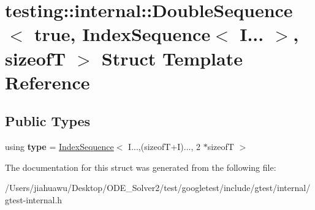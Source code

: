 \hypertarget{structtesting_1_1internal_1_1_double_sequence_3_01true_00_01_index_sequence_3_01_i_8_8_8_01_4_00_01sizeof_t_01_4}{}\section{testing\+:\+:internal\+:\+:Double\+Sequence$<$ true, Index\+Sequence$<$ I... $>$, sizeofT $>$ Struct Template Reference}
\label{structtesting_1_1internal_1_1_double_sequence_3_01true_00_01_index_sequence_3_01_i_8_8_8_01_4_00_01sizeof_t_01_4}
\subsection*{Public Types}
\begin{DoxyCompactItemize}
\item 
\mbox{\label{structtesting_1_1internal_1_1_double_sequence_3_01true_00_01_index_sequence_3_01_i_8_8_8_01_4_00_01sizeof_t_01_4_a6f0fbcc14f5264c7db52f3ba3e264545}} 
using {\bfseries type} = \mbox{\hyperlink{structtesting_1_1internal_1_1_index_sequence}{Index\+Sequence}}$<$ I...,(sizeofT+I)..., 2 $\ast$sizeofT $>$
\end{DoxyCompactItemize}


The documentation for this struct was generated from the following file\+:\begin{DoxyCompactItemize}
\item 
/\+Users/jiahuawu/\+Desktop/\+O\+D\+E\+\_\+\+Solver2/test/googletest/include/gtest/internal/gtest-\/internal.\+h\end{DoxyCompactItemize}
